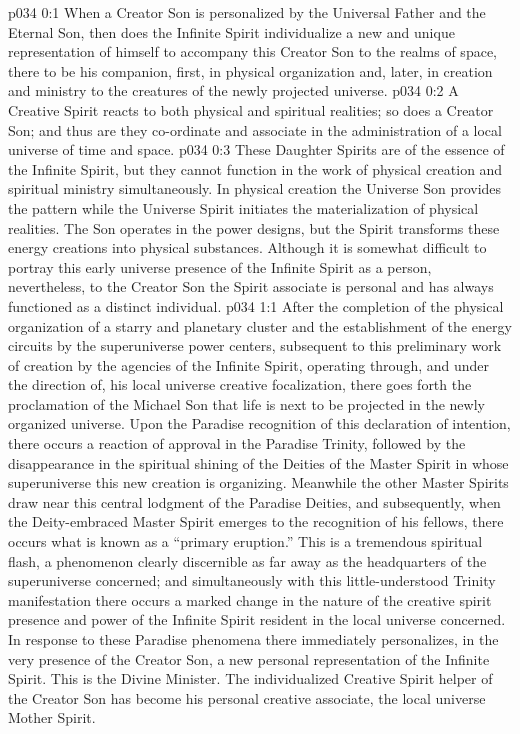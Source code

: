\author{Mighty Messenger}
\vs p034 0:1 When a Creator Son is personalized by the Universal Father and the Eternal Son, then does the Infinite Spirit individualize a new and unique representation of himself to accompany this Creator Son to the realms of space, there to be his companion, first, in physical organization and, later, in creation and ministry to the creatures of the newly projected universe.
\vs p034 0:2 A Creative Spirit reacts to both physical and spiritual realities; so does a Creator Son; and thus are they co\hyp{}ordinate and associate in the administration of a local universe of time and space.
\vs p034 0:3 These Daughter Spirits are of the essence of the Infinite Spirit, but they cannot function in the work of physical creation and spiritual ministry simultaneously. In physical creation the Universe Son provides the pattern while the Universe Spirit initiates the materialization of physical realities. The Son operates in the power designs, but the Spirit transforms these energy creations into physical substances. Although it is somewhat difficult to portray this early universe presence of the Infinite Spirit as a person, nevertheless, to the Creator Son the Spirit associate is personal and has always functioned as a distinct individual.\plusone
{}
\vs p034 1:1 After the completion of the physical organization of a starry and planetary cluster and the establishment of the energy circuits by the superuniverse power centers, subsequent to this preliminary work of creation by the agencies of the Infinite Spirit, operating through, and under the direction of, his local universe creative focalization, there goes forth the proclamation of the Michael Son that life is next to be projected in the newly organized universe. Upon the Paradise recognition of this declaration of intention, there occurs a reaction of approval in the Paradise Trinity, followed by the disappearance in the spiritual shining of the Deities of the Master Spirit in whose superuniverse this new creation is organizing. Meanwhile the other Master Spirits draw near this central lodgment of the Paradise Deities, and subsequently, when the Deity\hyp{}embraced Master Spirit emerges to the recognition of his fellows, there occurs what is known as a “primary eruption.” This is a tremendous spiritual flash, a phenomenon clearly discernible as far away as the headquarters of the superuniverse concerned; and simultaneously with this little\hyp{}understood Trinity manifestation there occurs a marked change in the nature of the creative spirit presence and power of the Infinite Spirit resident in the local universe concerned. In response to these Paradise phenomena there immediately personalizes, in the very presence of the Creator Son, a new personal representation of the Infinite Spirit. This is the Divine Minister. The individualized Creative Spirit helper of the Creator Son has become his personal creative associate, the local universe Mother Spirit.
